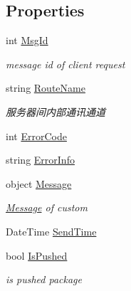 \subsection*{Properties}
\begin{DoxyCompactItemize}
\item 
int \mbox{\hyperlink{class_t_net_1_1_contract_1_1_remote_package_a9ef6ad2d8450a81c08798e40bd2d69f5}{Msg\+Id}}
\begin{DoxyCompactList}\small\item\em message id of client request \end{DoxyCompactList}\item 
string \mbox{\hyperlink{class_t_net_1_1_contract_1_1_remote_package_aaf8ba72f1362f75e1a3781ff975caf63}{Route\+Name}}
\begin{DoxyCompactList}\small\item\em 服务器间内部通讯通道 \end{DoxyCompactList}\item 
int \mbox{\hyperlink{class_t_net_1_1_contract_1_1_remote_package_a356fc18f54113529b4583c3a5d9bd7cc}{Error\+Code}}
\item 
string \mbox{\hyperlink{class_t_net_1_1_contract_1_1_remote_package_a3bfefd63fb0dbaf67dfbe8ebd63ad319}{Error\+Info}}
\item 
object \mbox{\hyperlink{class_t_net_1_1_contract_1_1_remote_package_a37d6ceba3d80ef2de4d64cc12788465a}{Message}}
\begin{DoxyCompactList}\small\item\em \mbox{\hyperlink{namespace_t_net_1_1_message}{Message}} of custom \end{DoxyCompactList}\item 
Date\+Time \mbox{\hyperlink{class_t_net_1_1_contract_1_1_remote_package_a26306f679ae5e12b9b12c0d2c7036498}{Send\+Time}}
\item 
bool \mbox{\hyperlink{class_t_net_1_1_contract_1_1_remote_package_ad21b912d587591f818fb22c71c4a293a}{Is\+Pushed}}
\begin{DoxyCompactList}\small\item\em is pushed package \end{DoxyCompactList}\end{DoxyCompactItemize}
